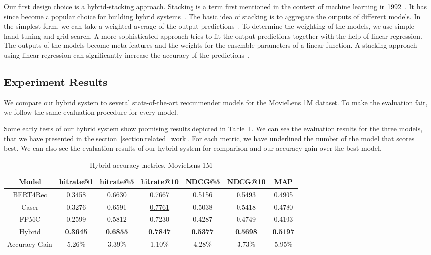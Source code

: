 Our first design choice is a hybrid-stacking approach. Stacking is a term first mentioned in the context of machine learning in 1992~\cite{wolpert1992stacked}. It has since become a popular choice for building hybrid systems~\cite{pavlyshenko2018using,sikora2015modified,dvzeroski2004combining}. The basic idea of stacking is to aggregate the outputs of different models. In the simplest form, we can take a weighted average of the output predictions~\cite{sagi2018ensemble}. To determine the weighting of the models, we use simple hand-tuning and grid search. A more sophisticated approach tries to fit the output predictions together with the help of linear regression. The outputs of the models become meta-features and the weights for the ensemble parameters of a linear function. A stacking approach using linear regression can significantly increase the accuracy of the predictions~\cite{breimanstacked,geron2019hands,sillfeature}.

\subsection{Experiment Results}

We compare our hybrid system to several state-of-the-art recommender models for the MovieLens 1M dataset. To make the evaluation fair, we follow the same evaluation procedure for every model. 

Some early tests of our hybrid system show promising results depicted in Table~\ref{tab:accuracy_hybrid}. We can see the evaluation results for the three models, that we have presented in the section~\ref{section:related_work}. For each metric, we have underlined the number of the model that scores best. We can also see the evaluation results of our hybrid system for comparison and our accuracy gain over the best model.
% 

\begin{table}[htbp!]
\centering
 \begin{tabular}{||c c c c c c c||} 
 \hline
 Model & hitrate@1 & hitrate@5 & hitrate@10 & NDCG@5 & NDCG@10 & MAP\\ [0.5ex] 
 \hline\hline
 BERT4Rec & \underline{0.3458} & \underline{0.6630} & 0.7667 & \underline{0.5156} & \underline{0.5493} & \underline{0.4905} \\ 
 Caser & 0.3276 & 0.6591 & \underline{0.7761} & 0.5038 & 0.5418 & 0.4780 \\
 FPMC & 0.2599 & 0.5812 & 0.7230 & 0.4287 & 0.4749 & 0.4103 \\
 \hline
 Hybrid & \textbf{0.3645} & \textbf{0.6855} & \textbf{0.7847} & \textbf{0.5377} & \textbf{0.5698} & \textbf{0.5197} \\ 
 Accuracy Gain & 5.26\% & 3.39\% & 1.10\% & 4.28\% & 3.73\% & 5.95\% \\
 \hline
\end{tabular}
\caption{Hybrid accuracy metrics, MovieLens 1M}
\label{tab:accuracy_hybrid}
\end{table}

